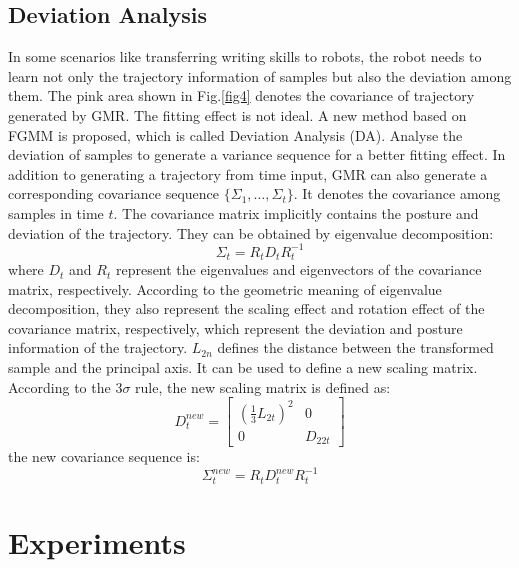 \documentclass[conference]{IEEEtran}
\begin{document}
\subsection{Deviation Analysis}
In some scenarios like transferring writing skills to robots, the robot needs to learn not only the trajectory information of samples but also the deviation among them. The pink area shown in Fig.\ref{fig4} denotes the covariance of trajectory generated by GMR. The fitting effect is not ideal. A new method based on FGMM is proposed, which is called Deviation Analysis (DA). Analyse the deviation of samples to generate a variance sequence for a better fitting effect. In addition to generating a trajectory from time input, GMR can also generate a corresponding covariance sequence $\{\Sigma_1,\hdots,\Sigma_t\}$. It denotes the covariance among samples in time $t$. The covariance matrix implicitly contains the posture and deviation of the trajectory. They can be obtained by eigenvalue decomposition:
\begin{equation}
    \Sigma_t=R_tD_tR_t^{-1}
\end{equation}
where $D_t$ and $R_t$ represent the eigenvalues and eigenvectors of the covariance matrix, respectively. According to the geometric meaning of eigenvalue decomposition, they also represent the scaling effect and rotation effect of the covariance matrix, respectively, which represent the deviation and posture information of the trajectory. $L_{2n}$ defines the distance between the transformed sample and the principal axis. It can be used to define a new scaling matrix. According to the $3\sigma$ rule, the new scaling matrix is defined as:
\begin{equation}
    D_t^{new}=\left[
        \begin{array}{cc}
            (\frac{1}{3}L_{2t})^2 & 0       \\
            0                     & D_{22t}
        \end{array}
        \right]
    \label{eq3}
\end{equation}
the new covariance sequence is:
\begin{equation}
    \Sigma^{new}_t=R_tD^{new}_tR_t^{-1}
\end{equation}

\section{Experiments}
\end{document}
